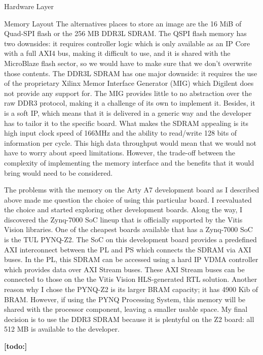 \documentclass{matthijs}
\begin{document}
\begin{hoofdstuk}{Hardware Layer}
\begin{paragraaf}{Memory Layout}
			The alternatives places to store an image are the 16 MiB of Quad-SPI flash or the 256 MB DDR3L SDRAM.
			The QSPI flash memory has two downsides: it requires controller logic which is only available as an IP Core with a full AXI4 bus, making it difficult to use, and it is shared with the MicroBlaze flash sector, so we would have to make sure that we don't overwrite those contents.
			The DDR3L SDRAM has one major downside: it requires the use of the proprietary Xilinx Memor Interface Generator (MIG) which Digilent does not provide any support for.
			The MIG provides little to no abstraction over the raw DDR3 protocol, making it a challenge of its own to implement it.
			Besides, it is a soft IP, which means that it is delivered in a generic way and the developer has to tailor it to the specific board.
			What makes the SDRAM appealing is its high input clock speed of 166MHz and the ability to read/write 128 bits of information per cycle.
			This high data throughput would mean that we would not have to worry about speed limitations.
			However, the trade-off between the complexity of implementing the memory interface and the benefits that it would bring would need to be considered.

			\bigskip

			The problems with the memory on the Arty A7 development board as I described above made me question the choice of using this particular board.
			I reevaluated the choice and started exploring other development boards.
			Along the way, I discovered the Zynq-7000 SoC lineup that is officially supported by the Vitis Vision libraries.
			One of the cheapest boards available that has a Zynq-7000 SoC is the TUL PYNQ-Z2.
			The SoC on this development board provides a predefined AXI interconnect between the PL and PS which connects the SDRAM via AXI buses.
			In the PL, this SDRAM can be accessed using a hard IP VDMA controller which provides data over AXI Stream buses.
			These AXI Stream buses can be connected to those on the the Vitis Vision HLS-generated RTL solution.
			Another reason why I chose the PYNQ-Z2 is its larger BRAM capacity; it has 4900 Kib of BRAM.
			However, if using the PYNQ Processing System, this memory will be shared with the processor component, leaving a smaller usable space.
			My final decision is to use the DDR3 SDRAM because it is plentyful on the Z2 board: all 512 MB is available to the developer.

		\end{paragraaf}

		\textbf{[todo:]}

	\end{hoofdstuk}
\end{document}
